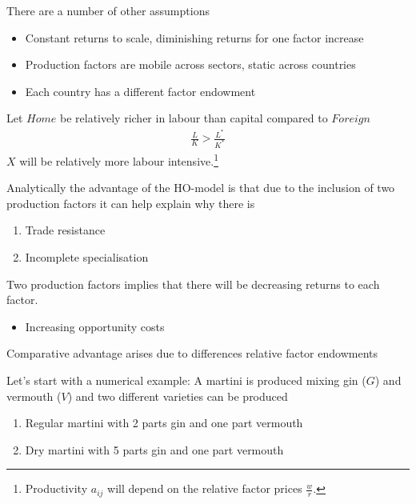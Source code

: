 \documentclass{beamer}
\begin{document}
\begin{frame}
  There are a number of other assumptions
  \begin{itemize}
    \item Constant returns to scale, diminishing returns for one factor increase
    \item Production factors are mobile across sectors, static across countries
    \item Each country has a different factor endowment    
  \end{itemize}
  \medskip
  Let $Home$ be relatively richer in labour than capital compared to $Foreign$
  \begin{align*}
    \frac{L}{K}>\frac{L^*}{K^*}
  \end{align*}
  \medskip
  $X$ will be relatively more labour intensive.\footnote{Productivity $a_{ij}$ will depend on the relative factor prices $\frac{w}{r}$.} 
\end{frame}

\begin{frame}
  Analytically the advantage of the HO-model is that due to the inclusion of two production factors it can help explain why there is
  \begin{enumerate}
    \item Trade resistance
    \item Incomplete specialisation
  \end{enumerate}
  \medskip
  Two production factors implies that there will be decreasing returns to each factor.
  \begin{itemize}
    \item Increasing opportunity costs        
  \end{itemize}
  \medskip
  Comparative advantage arises due to differences relative factor endowments   
\end{frame}

\begin{frame}
 Let's start with a numerical example: A martini is produced mixing gin ($G$) and vermouth ($V$) and two different varieties can be produced
 \begin{enumerate}
   \item Regular martini with 2 parts gin and one part vermouth
   \item Dry martini with 5 parts gin and one part vermouth
 \end{enumerate} 
\end{frame}  
\end{document}
